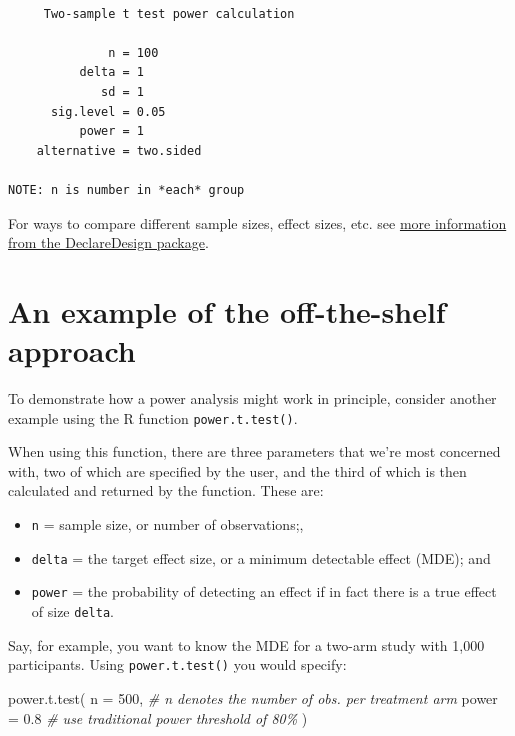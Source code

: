 \documentclass[
  12pt,
]{book}
\newenvironment{Shaded}{\begin{snugshade}}{\end{snugshade}}
\newcommand{\AttributeTok}[1]{\textcolor[rgb]{0.77,0.63,0.00}{#1}}
\newcommand{\CommentTok}[1]{\textcolor[rgb]{0.56,0.35,0.01}{\textit{#1}}}
\newcommand{\DecValTok}[1]{\textcolor[rgb]{0.00,0.00,0.81}{#1}}
\newcommand{\FloatTok}[1]{\textcolor[rgb]{0.00,0.00,0.81}{#1}}
\newcommand{\FunctionTok}[1]{\textcolor[rgb]{0.00,0.00,0.00}{#1}}
\newcommand{\NormalTok}[1]{#1}
\providecommand{\tightlist}{%
  \setlength{\itemsep}{0pt}\setlength{\parskip}{0pt}}
\theoremstyle{definition}
\theoremstyle{definition}
\theoremstyle{definition}
\theoremstyle{remark}
\begin{document}
\begin{verbatim}

     Two-sample t test power calculation 

              n = 100
          delta = 1
             sd = 1
      sig.level = 0.05
          power = 1
    alternative = two.sided

NOTE: n is number in *each* group
\end{verbatim}

For ways to compare different sample sizes, effect sizes, etc. see
\href{https://declaredesign.org/blog/2018-10-02-power-strategies.html}{more
information from the DeclareDesign package}.

\hypertarget{an-example-of-the-off-the-shelf-approach}{%
\section{An example of the off-the-shelf
approach}\label{an-example-of-the-off-the-shelf-approach}}

To demonstrate how a power analysis might work in principle, consider
another example using the R function \texttt{power.t.test()}.

When using this function, there are three parameters that we're most
concerned with, two of which are specified by the user, and the third of
which is then calculated and returned by the function. These are:

\begin{itemize}
\tightlist
\item
  \texttt{n} = sample size, or number of observations;,
\item
  \texttt{delta} = the target effect size, or a minimum detectable
  effect (MDE); and
\item
  \texttt{power} = the probability of detecting an effect if in fact
  there is a true effect of size \texttt{delta}.
\end{itemize}

Say, for example, you want to know the MDE for a two-arm study with
1,000 participants. Using \texttt{power.t.test()} you would specify:

\begin{Shaded}
\begin{Highlighting}[]
\FunctionTok{power.t.test}\NormalTok{(}
  \AttributeTok{n =} \DecValTok{500}\NormalTok{, }\CommentTok{\# n denotes the number of obs. per treatment arm}
  \AttributeTok{power =} \FloatTok{0.8} \CommentTok{\# use traditional power threshold of 80\%}
\NormalTok{)}
\end{Highlighting}
\end{Shaded}
\end{document}
